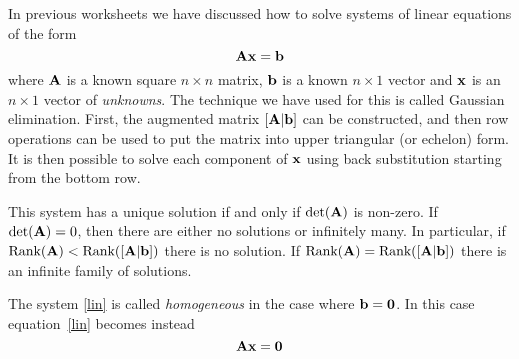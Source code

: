 In previous worksheets we have discussed how to solve systems of linear equations of the form
\begin{equation}\label{lin}
  {\bf A} { \bf x}= {\bf b}
\end{equation}
where ${\bf A}$ is a known square $n\times n$ matrix, ${\bf b}$ is a known
$n\times 1$ vector and ${\bf x}$ is an $n\times 1$ vector of \emph{unknowns}.
The technique we have used for this is called Gaussian elimination.
First, the augmented matrix $[  {\bf A}|{ \bf b} ]$ can be constructed, and then row operations can be used to put the matrix into upper triangular (or echelon) form. It is then possible to solve each component of ${\bf x}$ using back substitution starting from the bottom row.

This system has a unique solution if and only if $\text{det}( {\bf A})$ is non-zero. If $\text{det}( {\bf A})=0$, then there are either no solutions or infinitely many. In particular, if $\text{Rank}( {\bf A}) < \text{Rank}( [{\bf A}|{\bf b}])$ there is no solution. If $\text{Rank}( {\bf A}) = \text{Rank}([ {\bf A}|{\bf b}])$ there is an infinite family of solutions.

The system \eqref{lin} is called {\em homogeneous} in the case where ${\bf
b}={\bf 0}$. In this case equation~\eqref{lin} becomes instead
\begin{equation}
    {\bf A x} = {\bf 0}
    \label{eq:homo}
\end{equation}
